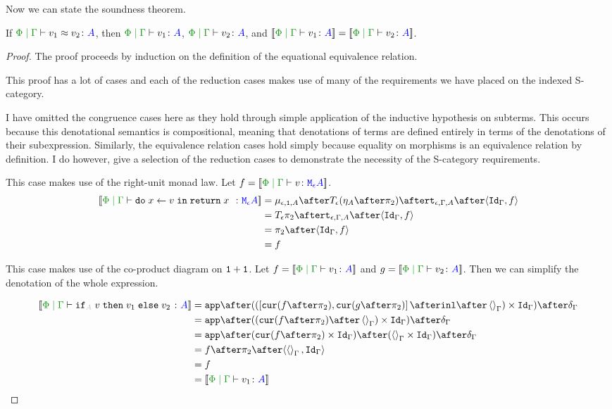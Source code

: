 \documentclass{Report}
\begin{document}
Now we can state the soundness theorem. 

\begin{theorem}[Soundness]
    If $\gpeberelation{v_1}{v_2}{A}$, then $\gpetyperelation{v_1}{A}$, $\gpetyperelation{v_2}{A}$, and $\deno{\gpetyperelation{v_1}{A}} = \deno{\gpetyperelation{v_2}{A}}$.
\end{theorem}


\begin{proof}
    The proof proceeds by induction on the definition of the equational equivalence relation.

    This proof has a lot of cases and each of the reduction cases makes use of many of the requirements we have placed on the indexed S-category.

    I have omitted the congruence cases here as they hold through simple application of the inductive hypothesis on subterms. This occurs because this denotational semantics is compositional, meaning that denotations of terms are defined entirely in terms of the denotations of their subexpression. Similarly, the equivalence relation cases hold simply because equality on morphisms is an equivalence relation by definition. I do however, give a selection of the reduction cases to demonstrate the necessity of the S-category requirements.

This case makes use of the right-unit monad law. Let $f = \deno{\gpetyperelation{v}{\mea}}$.
    \begin{equation}
    \begin{split}
        \deno{\gpetyperelation{\doin{x}{v}{\return{x}}}{\mea}}  & = \bind{\e}{\1}{A} \after \T{\e}{(\point{A} \after \pp)} \after \tstrength{\e}{\G}{A}\after \pr{\idg}{f} \\
        & = \T{\e}{\pp} \after \tstrength{\e}{\G}{A} \after \pr {\idg}{f} \\
        & = \pp \after \pr{\idg}{f}\\
        & = f
    \end{split}
\end{equation}

This case makes use of the co-product diagram on $\texttt{1} + \texttt{1}$. Let $f = \deno{\gpetyperelation{v_1}{A}}$  and  $g = \deno{\gpetyperelation{v_2}{A}}$. Then we can simplify the denotation of the whole expression.

\begin{equation}
    \begin{split}
        \deno{\gpetyperelation{\pifthenelse{A}{v}{v_1}{v_2}}{A}} & = \ifMorph{\inl\after\term{\G}}{f}{g} \\
        & = \app\after((\cur{f\after\pp}\after\term{\G})\times\idg)\after\diag{\G}\\
        & = \app\after(\cur{f\after\pp}\times\idg)\after(\term{\G}\times\idg)\after\diag{\G}\\
        & = f\after\pp\after\pr{\term{\G}}{\idg}\\
        & = f \\
        & = \deno{\gpetyperelation{v_1}{A}}\\
    \end{split}
\end{equation}


\end{proof}
\end{document}

